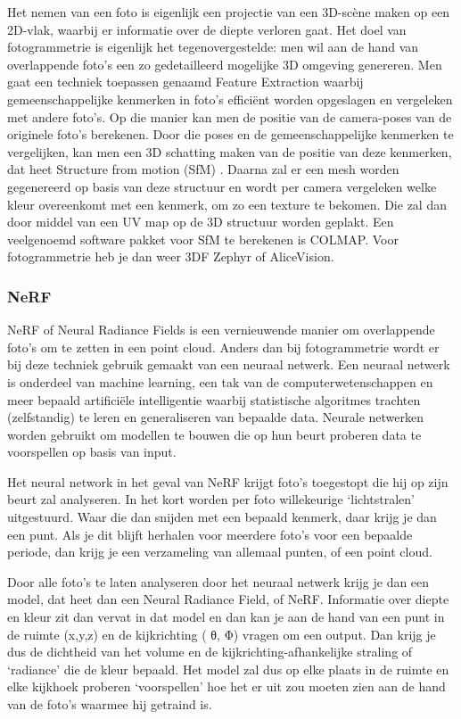 \documentclass{hogent-article}
\begin{document}
Het nemen van een foto is eigenlijk een projectie van een 3D-scène maken op een 2D-vlak, waarbij er informatie over de diepte verloren gaat. Het doel van fotogrammetrie is eigenlijk het tegenovergestelde: men wil aan de hand van overlappende foto’s een zo gedetailleerd mogelijke 3D omgeving genereren. \autocite{FormLabs}
Men gaat een techniek toepassen genaamd Feature Extraction waarbij gemeenschappelijke kenmerken in foto’s efficiënt worden opgeslagen en vergeleken met andere foto’s. Op die manier kan men de positie van de camera-poses van de originele foto’s berekenen. Door die poses en de gemeenschappelijke kenmerken te vergelijken, kan men een 3D schatting maken van de positie van deze kenmerken, dat heet Structure from motion (SfM) \autocite{Schonberger2016}. Daarna zal er een mesh worden gegenereerd op basis van deze structuur en wordt per camera vergeleken welke kleur overeenkomt met een kenmerk, om zo een texture te bekomen. Die zal dan door middel van een UV map op de 3D structuur worden geplakt. Een veelgenoemd software pakket voor SfM te berekenen is COLMAP. Voor fotogrammetrie heb je dan weer 3DF Zephyr of AliceVision. 

\subsubsection{NeRF}

NeRF of Neural Radiance Fields is een vernieuwende manier om overlappende foto’s om te zetten in een point cloud. Anders dan bij fotogrammetrie wordt er bij deze techniek gebruik gemaakt van een neuraal netwerk.
Een neuraal netwerk is onderdeel van machine learning, een tak van de computerwetenschappen en meer bepaald artificiële intelligentie waarbij statistische algoritmes trachten (zelfstandig)  te leren en generaliseren van bepaalde data. Neurale netwerken worden gebruikt om modellen te bouwen die op hun beurt proberen data te voorspellen op basis van input. 

Het neural network in het geval van NeRF krijgt foto’s toegestopt die hij op zijn beurt zal analyseren. In het kort worden per foto willekeurige ‘lichtstralen’ uitgestuurd. Waar die dan snijden met een bepaald kenmerk, daar krijg je dan een punt. Als je dit blijft herhalen voor meerdere foto’s voor een bepaalde periode, dan krijg je een verzameling van allemaal punten, of een point cloud. 

Door alle foto’s te laten analyseren door het neuraal netwerk krijg je dan een model, dat heet dan een Neural Radiance Field, of NeRF. Informatie over diepte en kleur zit dan vervat in dat model en dan kan je aan de hand van een punt in de ruimte (x,y,z) en de kijkrichting ( θ, Φ) vragen om een output. Dan krijg je dus de dichtheid van het volume en de kijkrichting-afhankelijke straling of ‘radiance’ die de kleur bepaald. Het model zal dus  op elke plaats in de ruimte en elke kijkhoek proberen ‘voorspellen’ hoe het er uit zou moeten zien aan de hand van de foto’s waarmee hij getraind is. \autocite{Mildenhall2020}
\end{document}
